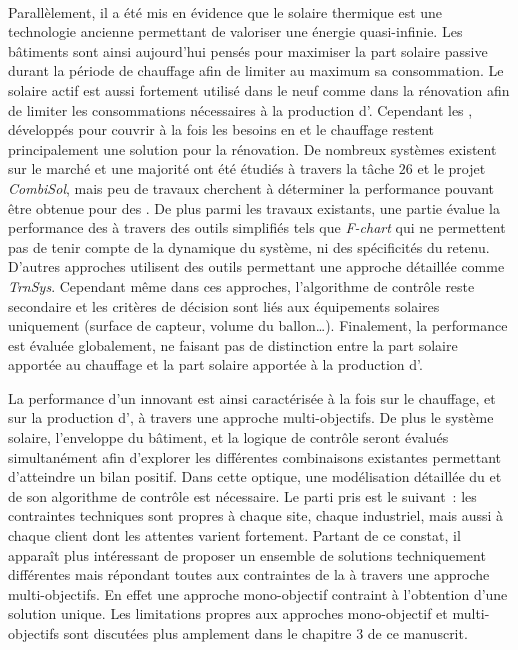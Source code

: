 \paragraph{} %
Parallèlement, il a été mis en évidence que le solaire thermique est une technologie ancienne
permettant de valoriser une énergie quasi-infinie. Les bâtiments sont ainsi aujourd’hui
pensés pour maximiser la part solaire passive durant la période de chauffage afin de
limiter au maximum sa consommation. Le solaire actif est aussi fortement utilisé dans le
neuf comme dans la rénovation afin de limiter les consommations nécessaires à la
production d’. Cependant les , développés pour couvrir à la fois les
besoins en  et le chauffage restent principalement une solution pour la
rénovation. De nombreux systèmes existent sur le marché et une majorité ont été étudiés à
travers la tâche $26$ et le projet \textit{CombiSol}, mais peu de travaux cherchent à
déterminer la performance pouvant être obtenue pour des . De plus parmi les
travaux existants, une partie évalue la performance des  à travers des outils
simplifiés tels que \textit{F-chart} qui ne permettent pas de tenir compte de la dynamique
du système, ni des spécificités du  retenu. D’autres approches utilisent des
outils permettant une approche détaillée comme \textit{TrnSys}. Cependant
même dans ces approches, l’algorithme de contrôle reste secondaire et les critères de
décision sont liés aux équipements solaires uniquement (surface de capteur, volume du
ballon\dots). Finalement, la performance est évaluée globalement, ne faisant pas de
distinction entre la part solaire apportée au chauffage et la part solaire apportée à la
production d’.

La performance d’un  innovant est ainsi caractérisée à la
fois sur le chauffage, et sur la production d’, à travers une approche
multi-objectifs. De plus le système solaire, l’enveloppe du bâtiment, et la logique de contrôle
seront évalués simultanément afin d’explorer les différentes combinaisons existantes
permettant d’atteindre un bilan positif.
Dans cette optique, une modélisation détaillée du  et de son algorithme de
contrôle est nécessaire. Le parti pris est le suivant~: les contraintes techniques sont
propres à chaque site, chaque industriel, mais aussi à chaque client dont les attentes
varient fortement. Partant de ce constat, il apparaît plus intéressant de proposer
un ensemble de solutions techniquement différentes mais répondant toutes aux contraintes
de la  à travers une approche multi-objectifs. En effet une approche mono-objectif
contraint à l’obtention d’une solution unique. Les limitations propres aux approches
mono-objectif et multi-objectifs sont discutées plus amplement dans le chapitre $3$ de ce
manuscrit.


